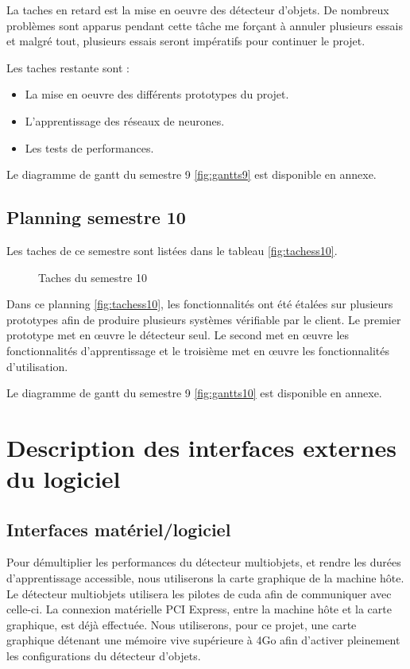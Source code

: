 \documentclass[debug,nodate,hideweeklyreports,noposter]{polytech/polytech}
\begin{document}
La taches en retard est la mise en oeuvre des détecteur d'objets. De nombreux problèmes sont apparus pendant cette tâche me forçant à annuler plusieurs essais et malgré tout, plusieurs essais seront impératifs pour continuer le projet.

Les taches restante sont :
\begin{itemize}
\item La mise en oeuvre des différents prototypes du projet.
\item L'apprentissage des réseaux de neurones.
\item Les tests de performances.
\end{itemize}

Le diagramme de gantt du semestre 9 \autoref{fig:gantts9} est disponible en annexe.

\section{Planning semestre 10}

Les taches de ce semestre sont listées dans le tableau \autoref{fig:tachess10}.

\begin{figure}
  \caption{Taches du semestre 10}
  \label{fig:tachess10}
\end{figure}

Dans ce planning \autoref{fig:tachess10}, les fonctionnalités ont été étalées sur plusieurs prototypes afin de produire plusieurs systèmes vérifiable par le client.
Le premier prototype met en œuvre le détecteur seul. Le second met en œuvre les fonctionnalités d’apprentissage et le troisième met en œuvre les fonctionnalités d’utilisation.

Le diagramme de gantt du semestre 9 \autoref{fig:gantts10} est disponible en annexe.
\appendix

\chapter{Description des interfaces externes du logiciel}
\label{ann:chap1}

\section{Interfaces matériel/logiciel}

Pour démultiplier les performances du détecteur multiobjets, et rendre les durées d’apprentissage accessible, nous utiliserons la carte graphique de la machine hôte. Le détecteur multiobjets utilisera les pilotes de \gls{cuda} afin de communiquer avec celle-ci. La connexion matérielle PCI Express, entre la machine hôte et la carte graphique, est déjà effectuée. Nous utiliserons, pour ce projet, une carte graphique détenant une mémoire vive supérieure à 4Go afin d’activer pleinement les configurations du détecteur d’objets.
\end{document}
